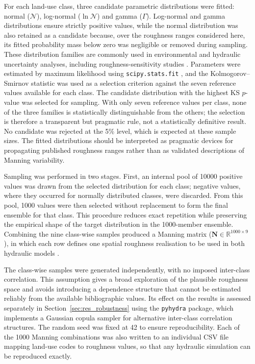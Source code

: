 \documentclass[a4paper,fleqn]{cas-sc}
\begin{document}
For each land-use class, three candidate parametric distributions were fitted: normal ($\mathcal{N}$), log-normal ($\ln\mathcal{N}$) and gamma ($\Gamma$). Log-normal and gamma distributions ensure strictly positive values, while the normal distribution was also retained as a candidate because, over the roughness ranges considered here, its fitted probability mass below zero was negligible or removed during sampling. These distribution families are commonly used in environmental and hydraulic uncertainty analyses, including roughness-sensitivity studies \citep{pappenberger2005,savage2016}. Parameters were estimated by maximum likelihood using \texttt{scipy.stats.fit} \citep{virtanen2020scipy}, and the Kolmogorov--Smirnov statistic was used as a selection criterion against the seven reference values available for each class. The candidate distribution with the highest KS $p$-value was selected for sampling. With only seven reference values per class, none of the three families is statistically distinguishable from the others; the selection is therefore a transparent but pragmatic rule, not a statistically definitive result. No candidate was rejected at the 5\% level, which is expected at these sample sizes. The fitted distributions should be interpreted as pragmatic devices for propagating published roughness ranges rather than as validated descriptions of Manning variability.

Sampling was performed in two stages. First, an internal pool of \num{10000} positive values was drawn from the selected distribution for each class; negative values, where they occurred for normally distributed classes, were discarded. From this pool, \num{1000} values were then selected without replacement to form the final ensemble for that class. This procedure reduces exact repetition while preserving the empirical shape of the target distribution in the \num{1000}-member ensemble. Combining the nine class-wise samples produced a Manning matrix ($\mathbf{N} \in \mathbb{R}^{1000 \times 9}$), in which each row defines one spatial roughness realisation to be used in both hydraulic models \citep{saltelli2010}.

The class-wise samples were generated independently, with no imposed inter-class correlation. This assumption gives a broad exploration of the plausible roughness space and avoids introducing a dependence structure that cannot be estimated reliably from the available bibliographic values. Its effect on the results is assessed separately in Section~\ref{sec:res_robustness} using the \texttt{pyhydra} package, which implements a Gaussian copula sampler for alternative inter-class correlation structures. The random seed was fixed at 42 to ensure reproducibility. Each of the \num{1000} Manning combinations was also written to an individual CSV file mapping land-use codes to roughness values, so that any hydraulic simulation can be reproduced exactly.
\end{document}
